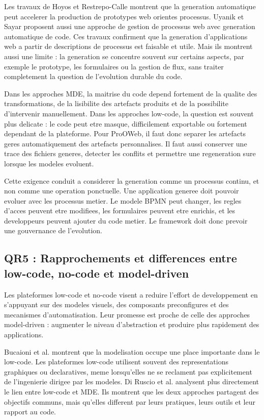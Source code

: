 \documentclass[12pt,a4paper]{article}
\begin{document}
Les travaux de Hoyos et Restrepo-Calle \cite{hoyos2017} montrent que la generation automatique peut accelerer la production de prototypes web orientes processus. Uyanik et Sayar \cite{uyanik2023} proposent aussi une approche de gestion de processus web avec generation automatique de code. Ces travaux confirment que la generation d'applications web a partir de descriptions de processus est faisable et utile. Mais ils montrent aussi une limite : la generation se concentre souvent sur certains aspects, par exemple le prototype, les formulaires ou la gestion de flux, sans traiter completement la question de l'evolution durable du code.

Dans les approches MDE, la maitrise du code depend fortement de la qualite des transformations, de la lisibilite des artefacts produits et de la possibilite d'intervenir manuellement. Dans les approches low-code, la question est souvent plus delicate : le code peut etre masque, difficilement exportable ou fortement dependant de la plateforme. Pour ProOWeb, il faut donc separer les artefacts geres automatiquement des artefacts personnalises. Il faut aussi conserver une trace des fichiers generes, detecter les conflits et permettre une regeneration sure lorsque les modeles evoluent.

Cette exigence conduit a considerer la generation comme un processus continu, et non comme une operation ponctuelle. Une application generee doit pouvoir evoluer avec les processus metier. Le modele BPMN peut changer, les regles d'acces peuvent etre modifiees, les formulaires peuvent etre enrichis, et les developpeurs peuvent ajouter du code metier. Le framework doit donc prevoir une gouvernance de l'evolution.

\subsection{QR5 : Rapprochements et differences entre low-code, no-code et model-driven}

Les plateformes low-code et no-code visent a reduire l'effort de developpement en s'appuyant sur des modeles visuels, des composants preconfigures et des mecanismes d'automatisation. Leur promesse est proche de celle des approches model-driven : augmenter le niveau d'abstraction et produire plus rapidement des applications.

Bucaioni et al. \cite{bucaioni2022} montrent que la modelisation occupe une place importante dans le low-code. Les plateformes low-code utilisent souvent des representations graphiques ou declaratives, meme lorsqu'elles ne se reclament pas explicitement de l'ingenierie dirigee par les modeles. Di Ruscio et al. \cite{diruscio2022} analysent plus directement le lien entre low-code et MDE. Ils montrent que les deux approches partagent des objectifs communs, mais qu'elles different par leurs pratiques, leurs outils et leur rapport au code.
\end{document}
